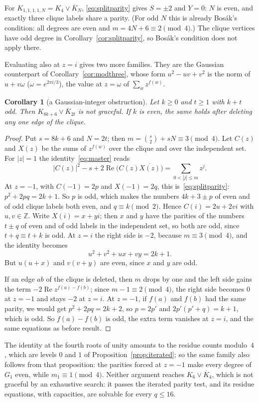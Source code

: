 \documentclass[11pt]{amsart}
\newcommand{\thmmarker}{}
\newcommand{\mgpt}{\gdef\thmmarker{\textsuperscript{$\dagger$}}}
\theoremstyle{tplain}
\newtheorem{corollary}[theorem]{Corollary}
\theoremstyle{tdefinition}
\theoremstyle{tremark}
\newcommand{\ZZ}{\mathbb Z}
\begin{document}
For $K_{1,1,1,1,N}=K_4\vee\overline K_N$, \eqref{eq:splitparity} gives
$S=\pm2$ and $Y=0$: $N$ is even, and exactly three clique labels share a
parity. (For odd $N$ this is already Bos\'ak's condition: all degrees are
even and $m=4N+6\equiv2\pmod4$.) The clique vertices have odd degree in Corollary~\ref{cor:splitparity},
so Bos\'ak's condition does not apply there.

Evaluating also at $z=i$ gives two more families. They are the Gaussian
counterpart of Corollary~\ref{cor:modthree}, whose form $u^2-uv+v^2$ is the
norm of $u+v\omega$ ($\omega=e^{2\pi i/3}$), the value at $z=\omega$ of
$\sum_wz^{f(w)}$.

\mgpt\begin{corollary}[a Gaussian-integer obstruction]\label{cor:gauss}
Let $k\ge0$ and $t\ge1$ with $k+t$ odd. Then $K_{8k+6}\vee\overline K_{2t}$
is not graceful. If $k$ is even, the same holds after deleting any one edge
of the clique.
\end{corollary}

\begin{proof}
Put $s=8k+6$ and $N=2t$; then $m=\binom s2+sN\equiv3\pmod4$. Let $C(z)$ and
$X(z)$ be the sums of $z^{f(w)}$ over the clique and over the independent
set. For $|z|=1$ the identity~\eqref{eq:master} reads
\[
 |C(z)|^2-s+2\operatorname{Re}\bigl(C(z)\overline{X(z)}\bigr)
 =\sum_{0<|j|\le m}z^j .
\]
At $z=-1$, with $C(-1)=2p$ and $X(-1)=2q$, this is~\eqref{eq:splitparity}:
$p^2+2pq=2k+1$. So $p$ is odd, which makes the numbers $4k+3\pm p$ of even
and of odd clique labels both even, and $q\equiv k\pmod2$. Hence
$C(i)=2u+2vi$ with $u,v\in\ZZ$. Write $X(i)=x+yi$; then $x$ and $y$ have
the parities of the numbers $t\pm q$ of even and of odd labels in the
independent set, so both are odd, since $t+q\equiv t+k$ is odd. At $z=i$ the
right side is $-2$, because $m\equiv3\pmod4$, and the identity becomes
\[
 u^2+v^2+ux+vy=2k+1 .
\]
But $u(u+x)$ and $v(v+y)$ are even, since $x$ and $y$ are odd.

If an edge $ab$ of the clique is deleted, then $m$ drops by one and the left
side gains the term $-2\operatorname{Re}z^{f(a)-f(b)}$; since
$m-1\equiv2\pmod4$, the right side becomes $0$ at $z=-1$ and stays $-2$ at
$z=i$. At $z=-1$, if $f(a)$ and $f(b)$ had the same parity, we would get
$p^2+2pq=2k+2$, so $p=2p'$ and $2p'(p'+q)=k+1$, which is odd. So
$f(a)-f(b)$ is odd, the extra term vanishes at $z=i$, and the same equations
as before result.
\end{proof}

The identity at the fourth roots of unity amounts to the residue counts
modulo~$4$, which are levels $0$ and $1$ of Proposition~\ref{prop:iterated};
so the same family also follows from that proposition: the parities forced at
$z=-1$ make every degree of $G_1$ even, while $m_1\equiv1\pmod4$. Neither
argument reaches $K_6\vee\overline K_4$, which is not graceful by an
exhaustive search: it passes the iterated parity test, and its residue
equations, with capacities, are solvable for every $q\le16$.
\end{document}
